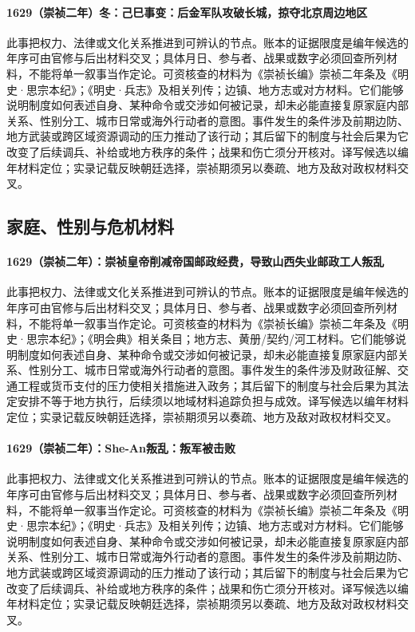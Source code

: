 \paragraph{1629（崇祯二年）冬：己巳事变：后金军队攻破长城，掠夺北京周边地区} 此事把权力、法律或文化关系推进到可辨认的节点。账本的证据限度是编年候选的年序可由官修与后出材料交叉；具体月日、参与者、战果或数字必须回查所列材料，不能将单一叙事当作定论。可资核查的材料为《崇祯长编》崇祯二年条及《明史·思宗本纪》；《明史·兵志》及相关列传；边镇、地方志或对方材料。它们能够说明制度如何表述自身、某种命令或交涉如何被记录，却未必能直接复原家庭内部关系、性别分工、城市日常或海外行动者的意图。事件发生的条件涉及前期边防、地方武装或跨区域资源调动的压力推动了该行动；其后留下的制度与社会后果为它改变了后续调兵、补给或地方秩序的条件；战果和伤亡须分开核对。译写候选以编年材料定位；实录记载反映朝廷选择，崇祯期须另以奏疏、地方及敌对政权材料交叉。

\subsection{家庭、性别与危机材料}

\paragraph{1629（崇祯二年）：崇祯皇帝削减帝国邮政经费，导致山西失业邮政工人叛乱} 此事把权力、法律或文化关系推进到可辨认的节点。账本的证据限度是编年候选的年序可由官修与后出材料交叉；具体月日、参与者、战果或数字必须回查所列材料，不能将单一叙事当作定论。可资核查的材料为《崇祯长编》崇祯二年条及《明史·思宗本纪》；《明会典》相关条目；地方志、黄册/契约/河工材料。它们能够说明制度如何表述自身、某种命令或交涉如何被记录，却未必能直接复原家庭内部关系、性别分工、城市日常或海外行动者的意图。事件发生的条件涉及财政征解、交通工程或货币支付的压力使相关措施进入政务；其后留下的制度与社会后果为其法定安排不等于地方执行，后续须以地域材料追踪负担与成效。译写候选以编年材料定位；实录记载反映朝廷选择，崇祯期须另以奏疏、地方及敌对政权材料交叉。

\paragraph{1629（崇祯二年）：She-An叛乱：叛军被击败} 此事把权力、法律或文化关系推进到可辨认的节点。账本的证据限度是编年候选的年序可由官修与后出材料交叉；具体月日、参与者、战果或数字必须回查所列材料，不能将单一叙事当作定论。可资核查的材料为《崇祯长编》崇祯二年条及《明史·思宗本纪》；《明史·兵志》及相关列传；边镇、地方志或对方材料。它们能够说明制度如何表述自身、某种命令或交涉如何被记录，却未必能直接复原家庭内部关系、性别分工、城市日常或海外行动者的意图。事件发生的条件涉及前期边防、地方武装或跨区域资源调动的压力推动了该行动；其后留下的制度与社会后果为它改变了后续调兵、补给或地方秩序的条件；战果和伤亡须分开核对。译写候选以编年材料定位；实录记载反映朝廷选择，崇祯期须另以奏疏、地方及敌对政权材料交叉。

